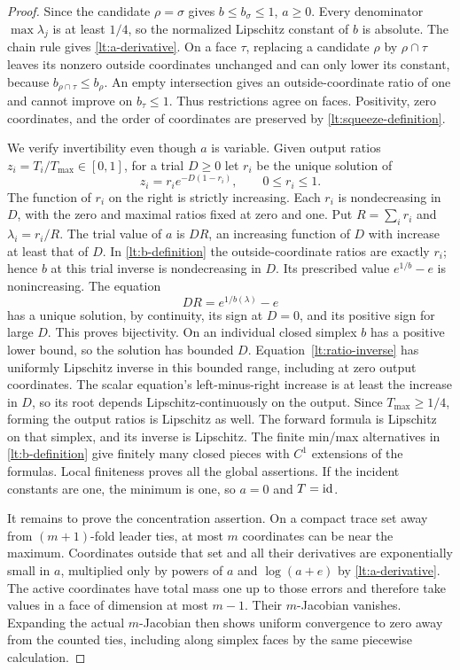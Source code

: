 \begin{proof}
Since the candidate $\rho=\sigma$ gives $b\leq b_\sigma\leq1$,
$a\geq0$.  Every denominator $\max\lambda_j$ is at least $1/4$,
so the normalized Lipschitz constant of $b$ is absolute.  The chain
rule gives \eqref{lt:a-derivative}.  On a face $\tau$, replacing a
candidate $\rho$ by $\rho\cap\tau$ leaves its nonzero outside
coordinates unchanged and can only lower its constant, because
$b_{\rho\cap\tau}\leq b_\rho$.  An empty intersection gives an
outside-coordinate ratio of one and cannot improve on $b_\tau\leq1$.
Thus restrictions agree on faces.  Positivity, zero coordinates, and
the order of coordinates are preserved by \eqref{lt:squeeze-definition}.

We verify invertibility even though $a$ is variable.  Given output
ratios $z_i=T_i/T_{\max}\in[0,1]$, for a trial $D\geq0$ let $r_i$
be the unique solution of
\begin{equation}
 z_i=r_i e^{-D(1-r_i)},\qquad 0\leq r_i\leq1.
 \label{lt:ratio-inverse}
\end{equation}
The function of $r_i$ on the right is strictly increasing.  Each
$r_i$ is nondecreasing in $D$, with the zero and maximal ratios fixed
at zero and one.  Put $R=\sum_i r_i$ and $\lambda_i=r_i/R$.
The trial value of $a$ is $DR$, an increasing function of $D$ with
increase at least that of $D$.  In \eqref{lt:b-definition} the
outside-coordinate ratios are exactly $r_i$; hence $b$ at this trial
inverse is nondecreasing in $D$.  Its prescribed value
$e^{1/b}-e$ is nonincreasing.  The equation
\[
 DR=e^{1/b(\lambda)}-e
\]
has a unique solution, by continuity, its sign at $D=0$, and its
positive sign for large $D$.  This proves bijectivity.
On an individual closed simplex $b$ has a positive lower bound, so
the solution has bounded $D$.  Equation~\eqref{lt:ratio-inverse}
has uniformly Lipschitz inverse in this bounded range, including at
zero output coordinates.  The scalar equation's left-minus-right
increase is at least the increase in $D$, so its root depends
Lipschitz-continuously on the output.  Since $T_{\max}\geq1/4$,
forming the output ratios is Lipschitz as well.  The forward formula
is Lipschitz on that simplex, and its inverse is Lipschitz.  The
finite min/max alternatives in \eqref{lt:b-definition} give finitely
many closed pieces with $C^1$ extensions of the formulas.  Local
finiteness proves all the global assertions.  If the incident
constants are one, the minimum is one, so $a=0$ and $T=\operatorname{id}$.

It remains to prove the concentration assertion.  On a compact trace
set away from $(m+1)$-fold leader ties, at most $m$ coordinates can be
near the maximum.  Coordinates outside that set and all their
derivatives are exponentially small in $a$, multiplied only by
powers of $a$ and $\log(a+e)$ by \eqref{lt:a-derivative}.  The active
coordinates have total mass one up to those errors and therefore
take values in a face of dimension at most $m-1$.  Their $m$-Jacobian
vanishes.  Expanding the actual $m$-Jacobian then shows uniform
convergence to zero away from the counted ties, including along
simplex faces by the same piecewise calculation.


\end{proof}
